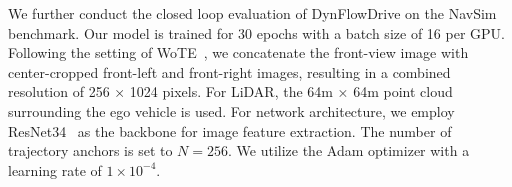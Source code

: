  We further conduct the closed loop evaluation of DynFlowDrive on the NavSim benchmark. Our model is trained for 30 epochs with a batch size of 16 per GPU. Following the setting of WoTE~\cite{li2025wote}, we concatenate the front-view image with center-cropped
front-left and front-right images, resulting in a combined resolution of 256 × 1024 pixels. For LiDAR, the 64m × 64m point cloud surrounding the ego vehicle is used. For network architecture, we employ ResNet34~\cite{he2016deep} as the backbone for image feature extraction. The number of trajectory anchors is set to $N=256$. We utilize the Adam optimizer with a learning rate of $1 \times 10^{-4}$.

\begin{table}[!t]
    \begin{center}
    \setlength{\tabcolsep}{6pt} 
    \renewcommand{\arraystretch}{1.1}
\end{center}
\end{table}
